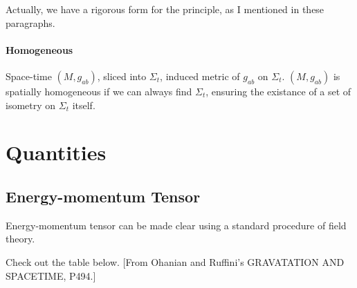 Actually, we have a rigorous form for the principle, as I mentioned in these paragraphs.

\paragraph{Homogeneous} 
Space-time $(M,g_{ab})$, sliced into ${\Sigma_t}$, induced metric of $g_{ab}$ on $\Sigma_t$. $(M, g_{ab})$ is spatially homogeneous if we can always find ${\Sigma_t}$, ensuring the existance of a set of isometry on $\Sigma_t$ itself.








































\section{Quantities}

\subsection{Energy-momentum Tensor}

Energy-momentum tensor can be made clear using a standard procedure of field theory.

Check out the table below. [From Ohanian and Ruffini's GRAVATATION AND SPACETIME, P494.]

